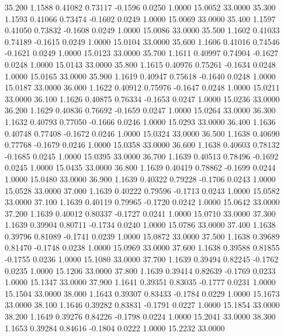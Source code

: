   35.200   1.1588   0.41082   0.73117  -0.1596   0.0250   1.0000  15.0052  33.0000
  35.300   1.1593   0.41066   0.73474  -0.1602   0.0249   1.0000  15.0069  33.0000
  35.400   1.1597   0.41050   0.73832  -0.1608   0.0249   1.0000  15.0086  33.0000
  35.500   1.1602   0.41033   0.74189  -0.1615   0.0249   1.0000  15.0104  33.0000
  35.600   1.1606   0.41016   0.74546  -0.1621   0.0249   1.0000  15.0123  33.0000
  35.700   1.1611   0.40997   0.74904  -0.1627   0.0248   1.0000  15.0143  33.0000
  35.800   1.1615   0.40976   0.75261  -0.1634   0.0248   1.0000  15.0165  33.0000
  35.900   1.1619   0.40947   0.75618  -0.1640   0.0248   1.0000  15.0187  33.0000
  36.000   1.1622   0.40912   0.75976  -0.1647   0.0248   1.0000  15.0211  33.0000
  36.100   1.1626   0.40875   0.76334  -0.1653   0.0247   1.0000  15.0236  33.0000
  36.200   1.1629   0.40836   0.76692  -0.1659   0.0247   1.0000  15.0264  33.0000
  36.300   1.1632   0.40793   0.77050  -0.1666   0.0246   1.0000  15.0293  33.0000
  36.400   1.1636   0.40748   0.77408  -0.1672   0.0246   1.0000  15.0324  33.0000
  36.500   1.1638   0.40690   0.77768  -0.1679   0.0246   1.0000  15.0358  33.0000
  36.600   1.1638   0.40603   0.78132  -0.1685   0.0245   1.0000  15.0395  33.0000
  36.700   1.1639   0.40513   0.78496  -0.1692   0.0245   1.0000  15.0435  33.0000
  36.800   1.1639   0.40419   0.78862  -0.1699   0.0244   1.0000  15.0480  33.0000
  36.900   1.1639   0.40322   0.79228  -0.1706   0.0243   1.0000  15.0528  33.0000
  37.000   1.1639   0.40222   0.79596  -0.1713   0.0243   1.0000  15.0582  33.0000
  37.100   1.1639   0.40119   0.79965  -0.1720   0.0242   1.0000  15.0642  33.0000
  37.200   1.1639   0.40012   0.80337  -0.1727   0.0241   1.0000  15.0710  33.0000
  37.300   1.1639   0.39904   0.80711  -0.1734   0.0240   1.0000  15.0786  33.0000
  37.400   1.1638   0.39796   0.81089  -0.1741   0.0239   1.0000  15.0872  33.0000
  37.500   1.1638   0.39689   0.81470  -0.1748   0.0238   1.0000  15.0969  33.0000
  37.600   1.1638   0.39588   0.81855  -0.1755   0.0236   1.0000  15.1080  33.0000
  37.700   1.1639   0.39494   0.82245  -0.1762   0.0235   1.0000  15.1206  33.0000
  37.800   1.1639   0.39414   0.82639  -0.1769   0.0233   1.0000  15.1347  33.0000
  37.900   1.1641   0.39351   0.83035  -0.1777   0.0231   1.0000  15.1504  33.0000
  38.000   1.1643   0.39307   0.83433  -0.1784   0.0229   1.0000  15.1673  33.0000
  38.100   1.1646   0.39282   0.83831  -0.1791   0.0227   1.0000  15.1854  33.0000
  38.200   1.1649   0.39276   0.84226  -0.1798   0.0224   1.0000  15.2041  33.0000
  38.300   1.1653   0.39284   0.84616  -0.1804   0.0222   1.0000  15.2232  33.0000
